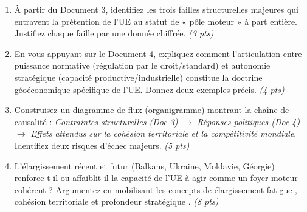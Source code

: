 \documentclass[11pt]{article}
\begin{document}
\begin{exercice}
    \begin{enumerate}
        \item À partir du Document 3, identifiez les trois failles structurelles majeures qui entravent la prétention de l'UE au statut de « pôle moteur » à part entière. Justifiez chaque faille par une donnée chiffrée. \textit{(3 pts)}
        \item En vous appuyant sur le Document 4, expliquez comment l'articulation entre \og puissance normative \fg (régulation par le droit/standard) et \og autonomie stratégique \fg (capacité productive/industrielle) constitue la doctrine géoéconomique spécifique de l'UE. Donnez deux exemples précis. \textit{(4 pts)}
        \item Construisez un diagramme de flux (organigramme) montrant la chaîne de causalité : \textit{Contraintes structurelles (Doc 3) $\rightarrow$ Réponses politiques (Doc 4) $\rightarrow$ Effets attendus sur la cohésion territoriale et la compétitivité mondiale}. Identifiez deux risques d'échec majeurs. \textit{(5 pts)}
        \item L'élargissement récent et futur (Balkans, Ukraine, Moldavie, Géorgie) renforce-t-il ou affaiblit-il la capacité de l'UE à agir comme un foyer moteur cohérent ? Argumentez en mobilisant les concepts de \og élargissement-fatigue \fg, \og cohésion territoriale \fg et \og profondeur stratégique \fg. \textit{(8 pts)}
    \end{enumerate}
\end{exercice}
\end{document}
